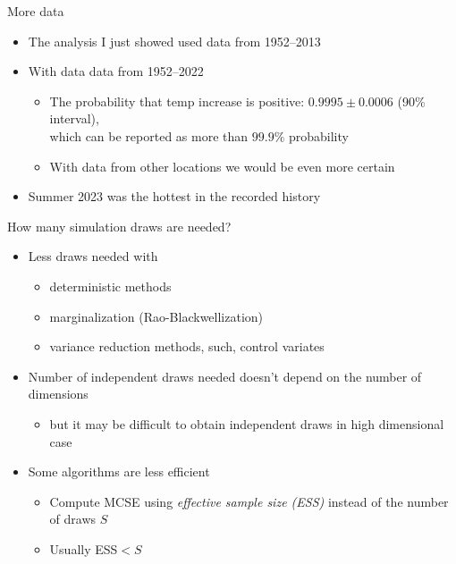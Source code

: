 \documentclass[finnish,english,t]{beamer}
\begin{document}
\begin{frame}{More data}

  \begin{itemize}
  \item<+-> The analysis I just showed used data from 1952--2013
  \item<+-> With data data from 1952--2022
    \begin{itemize}
    \item The probability that temp increase is positive:
      $0.9995 \pm 0.0006$ (90\% interval),\\ which can be reported as more than
      $99.9\%$ probability
    \item With data from other locations we would be even more certain
    \end{itemize}
  \item<+-> Summer 2023 was the hottest in the recorded history
  \end{itemize}

\end{frame}


\begin{frame}{How many simulation draws are needed?}

  \begin{itemize}
  \item Less draws needed with
    \begin{itemize}
    \item deterministic methods
    \item marginalization (Rao-Blackwellization)
    \item variance reduction methods, such, control variates
    \end{itemize}
  \item<2-> Number of independent draws needed doesn't depend on the
    number of dimensions
    \begin{itemize}
    \item but it may be difficult to obtain independent draws in high
      dimensional case
    \end{itemize}
  \item<3-> Some algorithms are less efficient
    \begin{itemize}
    \item Compute MCSE using \textit{effective sample size (ESS)}
      instead of the number of draws $S$
    \item Usually ESS$<S$
    \end{itemize}
  \end{itemize}

\end{frame}
\end{document}

